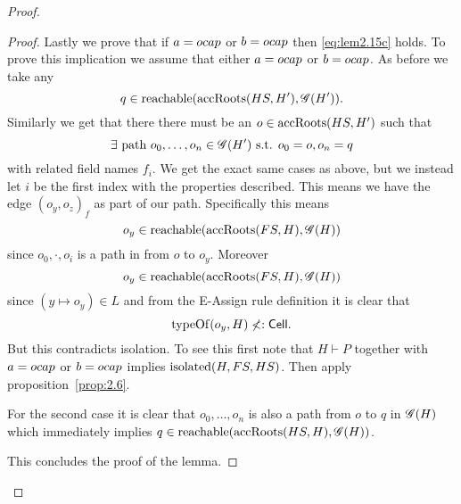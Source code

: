 \begin{proof}
\begin{description}
\begin{description}
\begin{description}
\begin{proof}
                Lastly we prove that if $a = \mbox{$ocap$}$ or $b = \mbox{$ocap$}$ then
                \eqref{eq:lem2.15c} holds. To prove this implication we assume
                that either $a = \mbox{$ocap$}$ or $b = \mbox{$ocap$}$. As before we take any
                \begin{equation}
                  q \in \mbox{$\mathrm{reachable}$}(\mbox{$\mathrm{accRoots}$}(HS, H'), \mathscr{G}(H')).
                \end{equation}
                Similarly we get that there there must be an $o \in
                \mbox{$\mathrm{accRoots}$}(HS, H')$ such that
                \begin{equation}
                  \exists \text{ path } o_0, \dots, o_n \in \mathscr{G}(H') \text{ s.t. } o_0 = o,
                  o_n = q
                \end{equation}
                with related field names $f_i$. We get the exact same cases as
                above, but we instead let $i$ be the first index with the
                properties described. This means we have the edge $(o_y, o_z)_f$
                as part of our path. Specifically this means
                \begin{equation}
                  o_y \in \mbox{$\mathrm{reachable}$}(\mbox{$\mathrm{accRoots}$}(FS, H), \mathscr{G}(H))
                \end{equation}
                since $o_0, \cdot, o_i$ is a path in \Graph from $o$ to $o_y$.
                Moreover
                \begin{equation}
                  o_y \in \mbox{$\mathrm{reachable}$}(\mbox{$\mathrm{accRoots}$}(FS, H), \mathscr{G}(H))
                \end{equation}
                since $(y \mapsto o_y) \in L$ and from the {\sc E-Assign} rule
                definition it is clear that
                \begin{equation}
                  \mbox{$\mathrm{typeOf}$}(o_y, H) \not<: \mbox{$\mathsf{Cell}$}.
                \end{equation}
                But this contradicts isolation. To see this first  note that
                $H \vdash P$ together with $a = \mbox{$ocap$}$ or $b = \mbox{$ocap$}$ implies
                $\mbox{$\mathrm{isolated}$}(H, FS, HS)$. Then apply proposition~\ref{prop:2.6}.
                
                For the second case it is clear that $o_0, \dots, o_n$ is also a
                path from $o$ to $q$ in $\mathscr{G}(H)$ which immediately implies
                $q \in \mbox{$\mathrm{reachable}$}(\mbox{$\mathrm{accRoots}$}(HS, H), \mathscr{G}(H))$.

                This concludes the proof of the lemma.
              \end{proof}


\end{description}
\end{description}
\end{description}
\end{proof}
